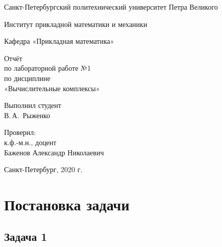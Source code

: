 \documentclass[12pt,a4paper]{scrartcl}
\begin{document}
\begin{titlepage}
  \begin{center}

    Санкт-Петербургский политехнический университет Петра Великого

    \vspace{0.25cm}
    
    Институт прикладной математики и механики
    
    Кафедра «Прикладная математика»
    \vfill

	\vspace{0.25cm}
	    Отчёт\\
	по лабораторной работе №1\\
	по дисциплине\\
	«Вычислительные комплексы»

  \bigskip

\end{center}
\vfill

\newlength{\ML}
\hfill\begin{minipage}{0.4\textwidth}
  Выполнил студент\\ В.\,А.~Рыженко\\
\end{minipage}%
\bigskip

\hfill\begin{minipage}{0.4\textwidth}
  Проверил:\\
к.ф.-м.н., доцент\\
Баженов Александр Николаевич\\
\end{minipage}%
\vfill

\begin{center}
  Санкт-Петербург, 2020 г.
\end{center}
\end{titlepage}

\tableofcontents
\newpage


\section{Постановка задачи}

\subsection{Задача 1}
\end{document}
